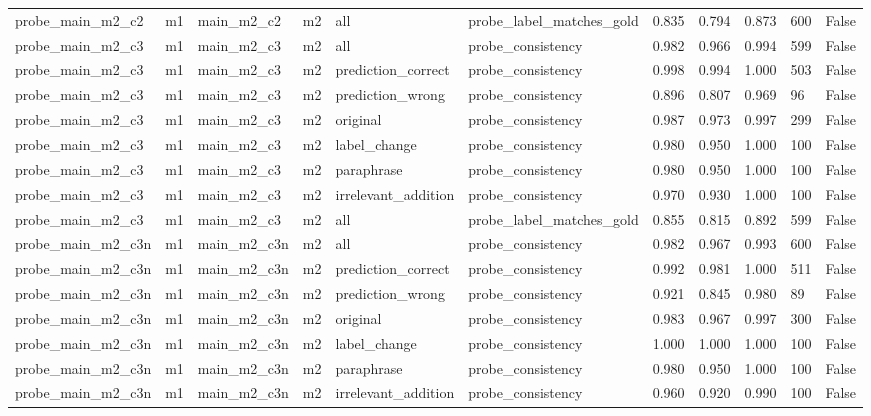\begin{tabular}{lllllllllll}
probe\_main\_m2\_c2 & m1 & main\_m2\_c2 & m2 & all & probe\_label\_matches\_gold & 0.835 & 0.794 & 0.873 & 600 & False \\
probe\_main\_m2\_c3 & m1 & main\_m2\_c3 & m2 & all & probe\_consistency & 0.982 & 0.966 & 0.994 & 599 & False \\
probe\_main\_m2\_c3 & m1 & main\_m2\_c3 & m2 & prediction\_correct & probe\_consistency & 0.998 & 0.994 & 1.000 & 503 & False \\
probe\_main\_m2\_c3 & m1 & main\_m2\_c3 & m2 & prediction\_wrong & probe\_consistency & 0.896 & 0.807 & 0.969 & 96 & False \\
probe\_main\_m2\_c3 & m1 & main\_m2\_c3 & m2 & original & probe\_consistency & 0.987 & 0.973 & 0.997 & 299 & False \\
probe\_main\_m2\_c3 & m1 & main\_m2\_c3 & m2 & label\_change & probe\_consistency & 0.980 & 0.950 & 1.000 & 100 & False \\
probe\_main\_m2\_c3 & m1 & main\_m2\_c3 & m2 & paraphrase & probe\_consistency & 0.980 & 0.950 & 1.000 & 100 & False \\
probe\_main\_m2\_c3 & m1 & main\_m2\_c3 & m2 & irrelevant\_addition & probe\_consistency & 0.970 & 0.930 & 1.000 & 100 & False \\
probe\_main\_m2\_c3 & m1 & main\_m2\_c3 & m2 & all & probe\_label\_matches\_gold & 0.855 & 0.815 & 0.892 & 599 & False \\
probe\_main\_m2\_c3n & m1 & main\_m2\_c3n & m2 & all & probe\_consistency & 0.982 & 0.967 & 0.993 & 600 & False \\
probe\_main\_m2\_c3n & m1 & main\_m2\_c3n & m2 & prediction\_correct & probe\_consistency & 0.992 & 0.981 & 1.000 & 511 & False \\
probe\_main\_m2\_c3n & m1 & main\_m2\_c3n & m2 & prediction\_wrong & probe\_consistency & 0.921 & 0.845 & 0.980 & 89 & False \\
probe\_main\_m2\_c3n & m1 & main\_m2\_c3n & m2 & original & probe\_consistency & 0.983 & 0.967 & 0.997 & 300 & False \\
probe\_main\_m2\_c3n & m1 & main\_m2\_c3n & m2 & label\_change & probe\_consistency & 1.000 & 1.000 & 1.000 & 100 & False \\
probe\_main\_m2\_c3n & m1 & main\_m2\_c3n & m2 & paraphrase & probe\_consistency & 0.980 & 0.950 & 1.000 & 100 & False \\
probe\_main\_m2\_c3n & m1 & main\_m2\_c3n & m2 & irrelevant\_addition & probe\_consistency & 0.960 & 0.920 & 0.990 & 100 & False \\

\end{tabular}
